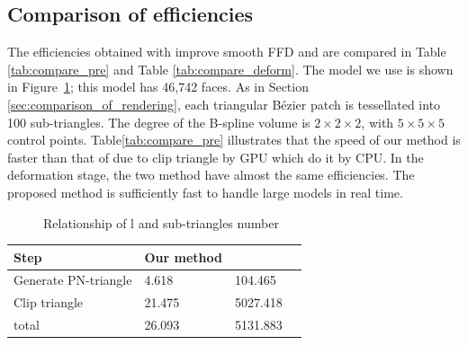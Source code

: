 \documentclass[3p]{elsarticle}
\makeatletter
\newcommand\tabcaption{\def\@captype{table}\caption}
\makeatother
\begin{document}
\subsection{Comparison of efficiencies}

The efficiencies obtained with improve smooth FFD and \cite{Cui15} are compared in Table \ref{tab:compare_pre} and Table \ref{tab:compare_deform}. The model we use is shown in Figure~\ref{fig:snail}; this model has 46,742 faces. As in Section \ref{sec:comparison_of_rendering}, each triangular B\'ezier patch is tessellated into 100 sub-triangles. The degree of the B-spline volume is $2\times2\times2$, with $5\times5\times5$ control points. Table\ref{tab:compare_pre} illustrates that the speed of our method is faster than that of \cite{Cui15} due to clip triangle by GPU which \cite{Cui15} do it by CPU. In the deformation stage, the two method have almost the same efficiencies. The proposed method is sufficiently fast to handle large models in real time.

\begin{figure}
  \centering
  \hfill
  \hfill
  \caption{Relationship of l and sub-triangles number}
  \label{fig:snail}
\end{figure}

\begin{minipage}[c]{0.7\textwidth} 
  \centering
  \footnotesize
    \tabcaption{Comparison of the efficiencies of our method and \cite{Cui15}(pre-compute stage)}
  \begin{tabular}{llll}
  	\hline
  	Step & Our method & \cite{Cui15}\\
  	\hline
  	Generate PN-triangle         & 4.618   & 104.465     \\
  	Clip triangle                & 21.475  & 5027.418    \\
  	\hline
  	total                        & 26.093  & 5131.883    \\
  	\hline
  \end{tabular}
    \label{tab:compare_pre}
\end{minipage} 
\end{document}
